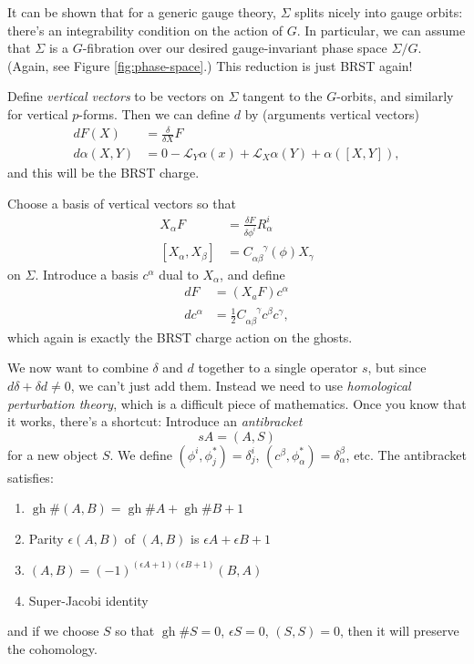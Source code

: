 It can be shown that for a generic gauge theory, $\Sigma$ splits nicely into gauge orbits: there's an integrability condition on the action of $G$.
In particular, we can assume that $\Sigma$ is a $G$-fibration over our desired gauge-invariant phase space $\Sigma/G$.
(Again, see Figure \ref{fig:phase-space}.)
This reduction is just BRST again!

Define \emph{vertical vectors} to be vectors on $\Sigma$ tangent to the $G$-orbits, and similarly for vertical $p$-forms.
Then we can define $d$ by (arguments vertical vectors)
\begin{align*}
dF(X) &= \frac{\delta}{\delta X}F\\
d \alpha(X,Y) &= 0 - \mathcal{L}_Y \alpha(x) + \mathcal{L}_X \alpha(Y) + \alpha([X,Y]),
\end{align*}
and this will be the BRST charge.

Choose a basis of vertical vectors so that
\begin{align*}
X_\alpha F &= \frac{\delta F}{\delta \phi^i} R_\alpha^i\\
[X_\alpha, X_\beta] &= C_{\alpha \beta}^{\phantom{\alpha \beta} \gamma}(\phi) X_\gamma
\end{align*}
on $\Sigma$.
Introduce a basis $c^\alpha$ dual to $X_\alpha$, and define
\begin{align*}
dF &= (X_a F)c^\alpha\\
dc^\alpha &= \frac{1}{2} C_{\alpha \beta}^{\phantom{\alpha \beta} \gamma} c^\beta c^\gamma,
\end{align*}
which again is exactly the BRST charge action on the ghosts.

We now want to combine $\delta$ and $d$ together to a single operator $s$, but since $d \delta + \delta d \ne 0$, we can't just add them.
Instead we need to use \emph{homological perturbation theory}, which is a difficult piece of mathematics.
Once you know that it works, there's a shortcut:
Introduce an \emph{antibracket}
\[
sA = (A,S) 
\]
for a new object $S$.
We define $(\phi^i, \phi_j^*) = \delta^i_j$, $(c^\beta, \phi_\alpha^*) = \delta_\alpha^\beta$, etc.
The antibracket satisfies:
\begin{enumerate}
    \item $\operatorname{gh}\#(A,B) = \operatorname{gh}\# A + \operatorname{gh}\# B + 1$
    \item Parity $\epsilon(A,B)$ of $(A,B)$ is $\epsilon A + \epsilon B + 1$
    \item $(A,B) = (-1)^{(\epsilon A +1)(\epsilon B +1)}(B,A)$
    \item Super-Jacobi identity
\end{enumerate}
and if we choose $S$ so that $\operatorname{gh} \# S = 0$, $\epsilon S = 0$, $(S,S) =0$, then it will preserve the cohomology.

